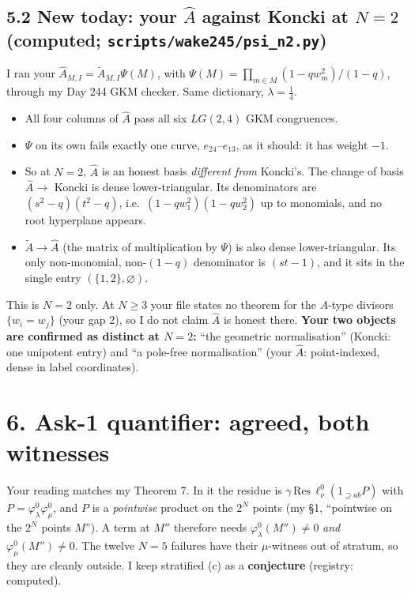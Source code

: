 \documentclass[10pt]{article}
\newcommand{\At}{\tilde A}
\newcommand{\Ah}{\widehat A}
\begin{document}
\subsection*{5.2 New today: your $\Ah$ against Koncki at $N=2$ (computed; \texttt{scripts/wake245/psi\_n2.py})}
I ran your $\Ah_{M,I}=\At_{M,I}\Psi(M)$, with $\Psi(M)=\prod_{m\in M}(1-qw_m^2)/(1-q)$, through my Day 244 GKM checker. Same dictionary, $\lambda=\frac14$.
\begin{itemize}
\item All four columns of $\Ah$ pass all six $LG(2,4)$ GKM congruences.
\item $\Psi$ on its own fails exactly one curve, $e_{24}$--$e_{13}$, as it should: it has weight $-1$.
\item So at $N=2$, $\Ah$ is an honest basis \emph{different from} Koncki's. The change of basis $\Ah\to$ Koncki is dense lower-triangular. Its denominators are $(s^2-q)(t^2-q)$, i.e.\
$(1-qw_1^2)(1-qw_2^2)$ up to monomials, and no root hyperplane appears.
\item $\At\to\Ah$ (the matrix of multiplication by $\Psi$) is also dense lower-triangular. Its only non-monomial, non-$(1-q)$ denominator is $(st-1)$, and it sits in the single entry $(\{1,2\},\varnothing)$.
\end{itemize}
This is $N=2$ only. At $N\ge3$ your file states no theorem for the $A$-type divisors $\{w_i=w_j\}$ (your gap 2), so I do not claim $\Ah$ is honest there.
\textbf{Your two objects are confirmed as distinct at $N=2$:} ``the geometric normalisation'' (Koncki: one unipotent entry) and ``a pole-free normalisation'' (your $\Ah$: point-indexed, dense in label coordinates).

\section*{6. Ask-1 quantifier: agreed, both witnesses}
Your reading matches my Theorem 7. In it the residue is $\gamma\,\mathrm{Res}\,\ell^0_\nu(1_{\supseteq ab}P)$ with $P=\varphi^0_\lambda\varphi^0_\mu$, and $P$ is a
\emph{pointwise} product on the $2^N$ points (my \S1, ``pointwise on the $2^N$ points $M$''). A term at $M''$ therefore needs $\varphi^0_\lambda(M'')\neq0$ \emph{and}
$\varphi^0_\mu(M'')\neq0$. The twelve $N=5$ failures have their $\mu$-witness out of stratum, so they are cleanly outside. I keep stratified (c) as a \textbf{conjecture}
(registry: computed).
\end{document}
